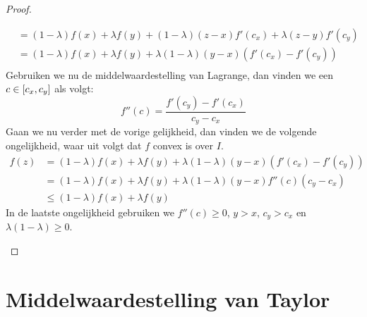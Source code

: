 \documentclass[main.tex]{subfiles}
\begin{document}
\begin{bpr}
\begin{proof}
\begin{itemize}
\[\begin{array}{rl}
        &= (1-\lambda)f(x) + \lambda f(y) + (1-\lambda)(z-x)f'(c_{x}) + \lambda(z-y)f'(c_{y})\\
        &= (1-\lambda)f(x) + \lambda f(y) + \lambda(1-\lambda)(y-x)(f'(c_{x})-f'(c_{y}))\\
      \end{array}
      \]
      Gebruiken we nu de middelwaardestelling van Lagrange, dan vinden we een $c \in \interval{c_{x}}{c_{y}}$ als volgt:
      \[ f''(c) = \frac{f'(c_{y})-f'(c_{x})}{c_{y}-c_{x}} \]
      Gaan we nu verder met de vorige gelijkheid, dan vinden we de volgende ongelijkheid, waar uit volgt dat $f$ convex is over $I$.
      \[ 
      \begin{array}{rl}
        f(z) &= (1-\lambda)f(x) + \lambda f(y) + \lambda(1-\lambda)(y-x)(f'(c_{x})-f'(c_{y}))\\
             &= (1-\lambda)f(x) + \lambda f(y) + \lambda(1-\lambda)(y-x)f''(c)(c_{y}-c_{x})\\
             &\le (1-\lambda)f(x) + \lambda f(y) 
      \end{array}
      \]
      In de laatste ongelijkheid gebruiken we $f''(c) \ge 0$, $y > x$, $c_{y}> c_{x}$ en $\lambda(1-\lambda) \ge 0$.
    \end{itemize}
  \end{proof}
\end{bpr}

\section{Middelwaardestelling van Taylor}
\label{sec:midd-van-tayl}
\end{document}
